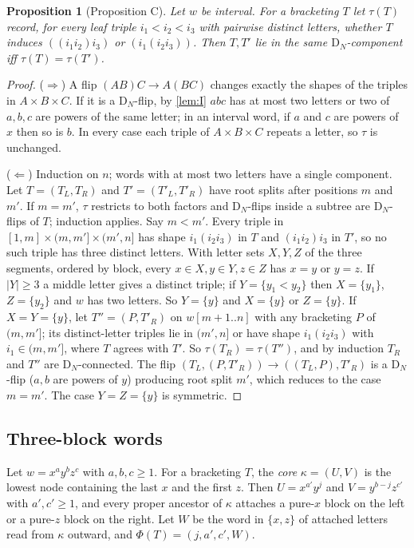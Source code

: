 \documentclass[11pt,a4paper]{article}
\newtheorem{proposition}[thm]{Proposition}
\theoremstyle{definition}
\theoremstyle{remark}
\newcommand{\DN}{\mathrm{D}_N}
\begin{document}
\begin{proposition}[Proposition C]\label{prop:C}
Let $w$ be interval. For a bracketing $T$ let $\tau(T)$ record, for every leaf triple $i_1<i_2<i_3$ with
pairwise distinct letters, whether $T$ induces $((i_1i_2)i_3)$ or $(i_1(i_2i_3))$. Then $T,T'$ lie in the
same $\DN$-component iff $\tau(T)=\tau(T')$.
\end{proposition}
\begin{proof}
($\Rightarrow$) A flip $(AB)C\to A(BC)$ changes exactly the shapes of the triples in $A\times B\times C$.
If it is a $\DN$-flip, by \cref{lem:I} $abc$ has at most two letters or two of $a,b,c$ are powers of the
same letter; in an interval word, if $a$ and $c$ are powers of $x$ then so is $b$. In every case each
triple of $A\times B\times C$ repeats a letter, so $\tau$ is unchanged.

($\Leftarrow$) Induction on $n$; words with at most two letters have a single component. Let
$T=(T_L,T_R)$ and $T'=(T'_L,T'_R)$ have root splits after positions $m$ and $m'$. If $m=m'$, $\tau$
restricts to both factors and $\DN$-flips inside a subtree are $\DN$-flips of $T$; induction applies.
Say $m<m'$. Every triple in $[1,m]\times(m,m']\times(m',n]$ has shape $i_1(i_2i_3)$ in $T$ and
$(i_1i_2)i_3$ in $T'$, so no such triple has three distinct letters. With letter sets $X,Y,Z$ of the
three segments, ordered by block, every $x\in X,y\in Y,z\in Z$ has $x=y$ or $y=z$. If
$\lvert Y\rvert\ge3$ a middle letter gives a distinct triple; if $Y=\{y_1<y_2\}$ then $X=\{y_1\}$,
$Z=\{y_2\}$ and $w$ has two letters. So $Y=\{y\}$ and $X=\{y\}$ or $Z=\{y\}$. If $X=Y=\{y\}$, let
$T''=(P,T'_R)$ on $w[m+1..n]$ with any bracketing $P$ of $(m,m']$; its distinct-letter triples lie in
$(m',n]$ or have shape $i_1(i_2i_3)$ with $i_1\in(m,m']$, where $T$ agrees with $T'$. So
$\tau(T_R)=\tau(T'')$, and by induction $T_R$ and $T''$ are $\DN$-connected. The flip
$(T_L,(P,T'_R))\to((T_L,P),T'_R)$ is a $\DN$-flip ($a,b$ are powers of $y$) producing root split $m'$,
which reduces to the case $m=m'$. The case $Y=Z=\{y\}$ is symmetric.
\end{proof}

\subsection{Three-block words}

Let $w=x^ay^bz^c$ with $a,b,c\ge1$. For a bracketing $T$, the \emph{core} $\kappa=(U,V)$ is the lowest
node containing the last $x$ and the first $z$. Then $U=x^{a'}y^j$ and $V=y^{b-j}z^{c'}$ with
$a',c'\ge1$, and every proper ancestor of $\kappa$ attaches a pure-$x$ block on the left or a pure-$z$
block on the right. Let $W$ be the word in $\{x,z\}$ of attached letters read from $\kappa$ outward, and
$\Phi(T)=(j,a',c',W)$.
\end{document}
